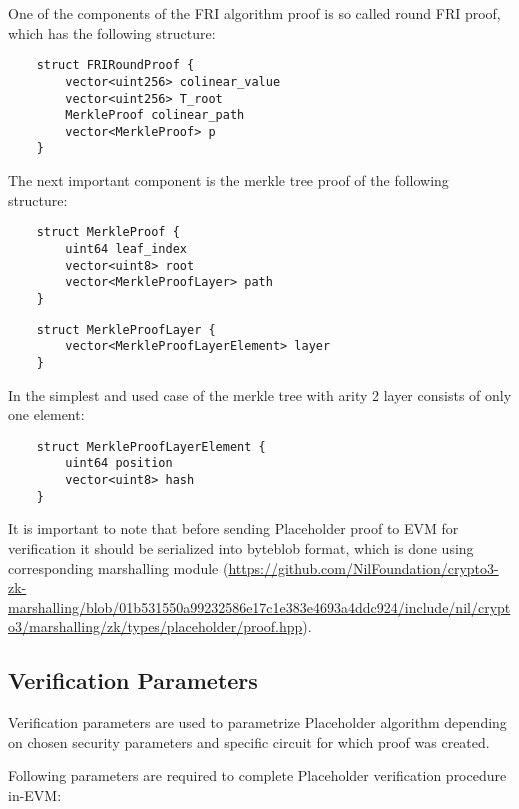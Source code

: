 One of the components of the FRI algorithm proof is so called round FRI proof, which has the following structure:

\begin{verbatim}
    struct FRIRoundProof {
        vector<uint256> colinear_value
        vector<uint256> T_root
        MerkleProof colinear_path
        vector<MerkleProof> p
    }
\end{verbatim}

The next important component is the merkle tree proof of the following structure:

\begin{verbatim}
    struct MerkleProof {
        uint64 leaf_index
        vector<uint8> root
        vector<MerkleProofLayer> path
    }
\end{verbatim}

\begin{verbatim}
    struct MerkleProofLayer {
        vector<MerkleProofLayerElement> layer
    }       
\end{verbatim}

In the simplest and used case of the merkle tree with arity 2 layer consists of only one element:

\begin{verbatim}
    struct MerkleProofLayerElement {
        uint64 position
        vector<uint8> hash
    }
\end{verbatim}

It is important to note that before sending Placeholder proof to EVM for verification it should be serialized into byteblob format,
which is done using corresponding marshalling module 
(\url{https://github.com/NilFoundation/crypto3-zk-marshalling/blob/01b531550a99232586e17c1e383e4693a4ddc924/include/nil/crypto3/marshalling/zk/types/placeholder/proof.hpp}).

\subsection{Verification Parameters}

Verification parameters are used to parametrize Placeholder algorithm depending on chosen security parameters and specific circuit for which proof was created.

Following parameters are required to complete Placeholder verification procedure in-EVM:

